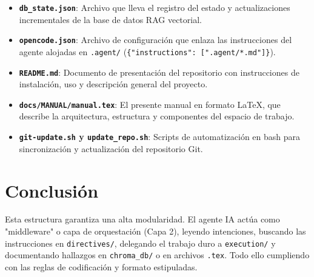 \documentclass[12pt,a4paper]{article}
\begin{document}
\begin{itemize}
    \item \textbf{\texttt{db\_state.json}}: Archivo que lleva el registro del estado y actualizaciones incrementales de la base de datos RAG vectorial.
    \item \textbf{\texttt{opencode.json}}: Archivo de configuración que enlaza las instrucciones del agente alojadas en \texttt{.agent/} (\texttt{\{"instructions": [".agent/*.md"]\}}).
    \item \textbf{\texttt{README.md}}: Documento de presentación del repositorio con instrucciones de instalación, uso y descripción general del proyecto.
    \item \textbf{\texttt{docs/MANUAL/manual.tex}}: El presente manual en formato LaTeX, que describe la arquitectura, estructura y componentes del espacio de trabajo.
    \item \textbf{\texttt{git-update.sh} y \texttt{update\_repo.sh}}: Scripts de automatización en bash para sincronización y actualización del repositorio Git.
\end{itemize}

\section{Conclusión}
Esta estructura garantiza una alta modularidad. El agente IA actúa como "middleware" o capa de orquestación (Capa 2), leyendo intenciones, buscando las instrucciones en \texttt{directives/}, delegando el trabajo duro a \texttt{execution/} y documentando hallazgos en \texttt{chroma\_db/} o en archivos \texttt{.tex}. Todo ello cumpliendo con las reglas de codificación y formato estipuladas.
\end{document}
